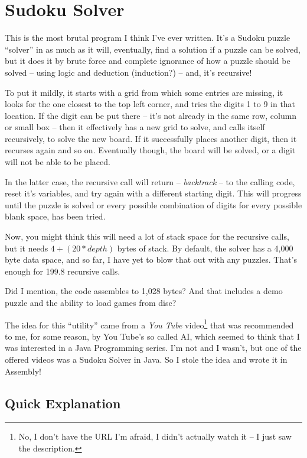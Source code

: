 
\chapter{Sudoku Solver}

This is the most brutal program I think I've ever written. It's a
Sudoku puzzle ``solver'' in as much as it will, eventually, find
a solution if a puzzle can be solved, but it does it by brute force
and complete ignorance of how a puzzle should be solved -- using
logic and deduction (induction?) -- and, it's recursive!

To put it mildly, it starts with a grid from which some entries are
missing, it looks for the one closest to the top left corner, and
tries the digits 1 to 9 in that location. If the digit can be put
there -- it's not already in the same row, column or small box --
then it effectively has a new grid to solve, and calls itself recursively,
to solve the new board. If it successfully places another digit, then
it recurses again and so on. Eventually though, the board will be
solved, or a digit will not be able to be placed. 

In the latter case, the recursive call will return -- \emph{backtrack}
-- to the calling code, reset it's variables, and try again with
a different starting digit. This will progress until the puzzle is
solved or every possible combination of digits for every possible
blank space, has been tried.

Now, you might think this will need a lot of stack space for the recursive
calls, but it needs $4+(20*depth)$ bytes of stack. By default, the
solver has a 4,000 byte data space, and so far, I have yet to blow
that out with any puzzles. That's enough for 199.8 recursive calls.

Did I mention, the code assembles to 1,028 bytes? And that includes
a demo puzzle and the ability to load games from disc?

The idea for this ``utility'' came from a \emph{You Tube} video\footnote{No, I don't have the URL I'm afraid, I didn't actually watch it --
I just saw the description.} that was recommended to me, for some reason, by You Tube's so called
AI, which seemed to think that I was interested in a Java Programming
series. I'm not and I wasn't, but one of the offered videos was a
Sudoku Solver in Java. So I stole the idea and wrote it in Assembly!

\section{Quick Explanation}

